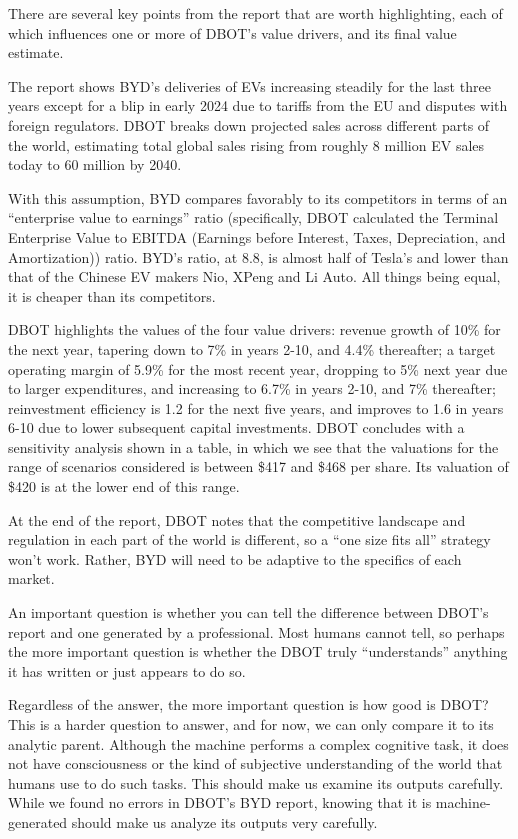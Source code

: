 \documentclass[]{interact}
\theoremstyle{plain}%
\theoremstyle{definition}
\theoremstyle{remark}
\begin{document}
There are several key points from the report that are worth highlighting, each of which influences one or more of DBOT’s value drivers, and its final value estimate.

The report shows BYD’s deliveries of EVs increasing steadily for the last three years except for a blip in early 2024 due to tariffs from the EU and disputes with foreign regulators. DBOT breaks down projected sales across different parts of the world, estimating total global sales rising from roughly 8 million EV sales today to 60 million by 2040.

With this assumption, BYD compares favorably to its competitors in terms of an “enterprise value to earnings” ratio (specifically, DBOT calculated the Terminal Enterprise Value to EBITDA (Earnings before Interest, Taxes, Depreciation, and Amortization)) ratio. BYD’s ratio, at 8.8, is almost half of Tesla’s and lower than that of the Chinese EV makers Nio, XPeng and Li Auto. All things being equal, it is cheaper than its competitors.

DBOT highlights the values of the four value drivers: revenue growth of 10\% for the next year, tapering down to 7\% in years 2-10, and 4.4\% thereafter; a target operating margin of 5.9\% for the most recent year, dropping to 5\% next year due to larger expenditures, and increasing to 6.7\% in years 2-10, and 7\% thereafter;  reinvestment efficiency is 1.2 for the next five years, and improves to 1.6 in years 6-10 due to lower subsequent capital investments. 
DBOT concludes with a sensitivity analysis shown in a table, in which we see that the valuations for the range of scenarios considered is between \$417 and \$468 per share. Its valuation of \$420 is at the lower end of this range.

At the end of the report, DBOT notes that the competitive landscape and regulation in each part of the world is different, so a “one size fits all” strategy won’t work. Rather, BYD will need to be adaptive to the specifics of each market.

An important question is whether you can tell the difference between DBOT’s report and one generated by a professional. Most humans cannot tell, so perhaps the more important question is whether the DBOT truly “understands” anything it has written or just appears to do so. 

Regardless of the answer, the  more important question is how good is DBOT? This is a harder question to answer, and for now, we can only compare it to its analytic parent. Although the machine performs a complex cognitive task, it does not have consciousness or the kind of subjective understanding of the world that humans use to do such tasks. This should make us examine its outputs carefully. While we found no errors in DBOT's BYD report, knowing that it is machine-generated should make us analyze its outputs very carefully. 
\end{document}
